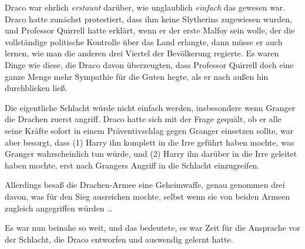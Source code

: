 Draco war ehrlich \emph{erstaunt} darüber, wie unglaublich \emph{einfach} das gewesen war. Draco hatte zunächst protestiert, dass ihm keine Slytherins zugewiesen wurden, und Professor Quirrell hatte erklärt, wenn er der erste Malfoy sein wolle, der die vollständige politische Kontrolle über das Land erlangte, dann müsse er auch lernen, wie man die anderen drei Viertel der Bevölkerung regierte. Es waren Dinge wie diese, die Draco davon überzeugten, dass Professor Quirrell doch eine ganze Menge mehr Sympathie für die Guten hegte, als er nach außen hin durchblicken ließ.

Die eigentliche Schlacht würde nicht einfach werden, insbesondere wenn Granger die Drachen zuerst angriff. Draco hatte sich mit der Frage gequält, ob er alle seine Kräfte sofort in einem Präventivschlag gegen Granger einsetzen sollte, war aber besorgt, dass (1) Harry ihn komplett in die Irre geführt haben mochte, was Granger wahrscheinlich tun würde, und (2) Harry ihn darüber in die Irre geleitet haben mochte, erst nach Grangers Angriff in die Schlacht einzugreifen.

Allerdings besaß die Drachen-Armee eine Geheimwaffe, genau genommen drei davon, was für den Sieg ausreichen mochte, selbst wenn sie von beiden Armeen zugleich angegriffen würden …

Es war nun beinahe so weit, und das bedeutete, es war Zeit für die Ansprache vor der Schlacht, die Draco entworfen und auswendig gelernt hatte.

